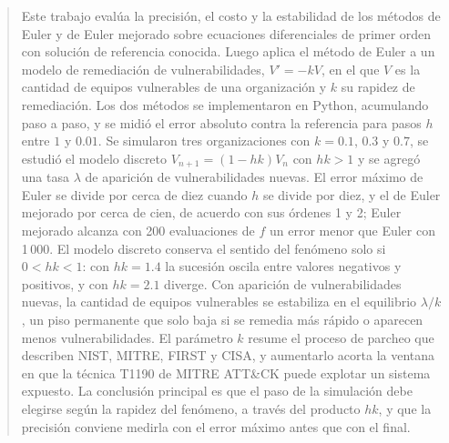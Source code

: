 \begin{abstract}

Este trabajo evalúa la precisión, el costo y la estabilidad de los métodos de Euler y de Euler
mejorado sobre ecuaciones diferenciales de primer orden con solución de referencia conocida.
Luego aplica el método de Euler a un modelo de remediación de vulnerabilidades, $V' = -kV$, en el
que $V$ es la cantidad de equipos vulnerables de una organización y $k$ su rapidez de remediación.
Los dos métodos se implementaron en Python, acumulando paso a paso, y se midió el error
absoluto contra la referencia para pasos $h$ entre $1$ y $0.01$. Se simularon tres
organizaciones con $k = 0.1$, $0.3$ y $0.7$, se estudió el modelo discreto
$V_{n+1} = (1 - hk)V_n$ con $hk > 1$ y se agregó una tasa $\lambda$ de aparición de
vulnerabilidades nuevas. El error máximo de Euler se divide por cerca de diez cuando $h$ se
divide por diez, y el de Euler mejorado por cerca de cien, de acuerdo con sus órdenes 1 y 2;
Euler mejorado alcanza con 200 evaluaciones de $f$ un error menor que Euler con 1\,000. El
modelo discreto conserva el sentido del fenómeno solo si $0 < hk < 1$: con $hk = 1.4$ la
sucesión oscila entre valores negativos y positivos, y con $hk = 2.1$ diverge. Con aparición de
vulnerabilidades nuevas, la cantidad de equipos vulnerables se estabiliza en el equilibrio
$\lambda/k$, un piso permanente que solo baja si se remedia más rápido o aparecen menos
vulnerabilidades. El parámetro $k$ resume el proceso de parcheo que describen NIST, MITRE, FIRST
y CISA, y aumentarlo acorta la ventana en que la técnica T1190 de MITRE ATT\&CK puede explotar
un sistema expuesto. La conclusión principal es que el paso de la simulación debe elegirse según
la rapidez del fenómeno, a través del producto $hk$, y que la precisión conviene medirla con el
error máximo antes que con el final.
\end{abstract}
